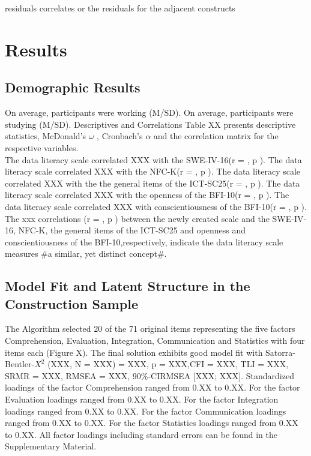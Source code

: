 \documentclass[
  12pt,
  a4paper,
  twoside]{article}
\begin{document}
residuals
correlates or the residuals for the adjacent constructs

\section{Results}\label{results}

\subsection{Demographic Results}\label{demographic-results}

On average, participants were working (M/SD). On average, participants were studying (M/SD). Descriptives and Correlations
Table XX
presents descriptive statistics, McDonald's \(\omega\) ,
Cronbach's \(\alpha\) and the correlation matrix for the respective variables.\\
The data literacy scale correlated XXX with the SWE-IV-16(r = , p ). The data literacy scale correlated XXX with the NFC-K(r = , p ). The data literacy scale correlated XXX with the the general items of the ICT-SC25(r = , p ). The data literacy scale correlated XXX with the openness of the BFI-10(r = , p ). The data literacy scale correlated XXX with conscientiousness of the BFI-10(r = , p ). The xxx correlations (r = , p ) between the newly created scale and the SWE-IV-16, NFC-K, the general items of the ICT-SC25 and openness and conscientiousness of the BFI-10,respectively, indicate the data literacy scale measures \#a similar, yet distinct concept\#.

\subsection{Model Fit and Latent Structure in the Construction Sample}\label{model-fit-and-latent-structure-in-the-construction-sample}

The Algorithm selected 20 of the 71 original items representing the five factors Comprehension, Evaluation, Integration, Communication and Statistics with four items each (Figure X). The final solution exhibits good model fit with Satorra-Bentler-\(X^{2}\) (XXX, N = XXX) = XXX, p = XXX,CFI = XXX, TLI = XXX, SRMR = XXX, RMSEA = XXX, 90\%-CIRMSEA {[}XXX; XXX{]}.
Standardized loadings of the factor Comprehension ranged from 0.XX to 0.XX. For the factor Evaluation loadings ranged from 0.XX to 0.XX. For the factor Integration loadings ranged from 0.XX to 0.XX. For the factor Communication loadings ranged from 0.XX to 0.XX. For the factor Statistics loadings ranged from 0.XX to 0.XX.
All factor loadings including standard errors can be found in the Supplementary Material.
\end{document}
